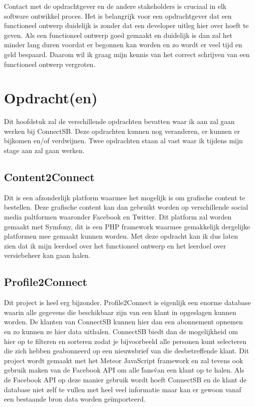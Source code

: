 \documentclass{article}
\begin{document}
Contact met de opdrachtgever en de andere stakeholders is cruciaal in elk software ontwikkel proces. Het is belangrijk voor een opdrachtgever dat een functioneel ontwerp duidelijk is zonder dat een developer uitleg hier over hoeft te geven. Als een functioneel ontwerp goed gemaakt en duidelijk is dan zal het minder lang duren voordat er begonnen kan worden en zo wordt er veel tijd en geld bespaard. Daarom wil ik graag mijn kennis van het correct schrijven van een functioneel ontwerp vergroten.



\section{Opdracht(en)}
Dit hoofdstuk zal de verschillende opdrachten bevatten waar ik aan zal gaan werken bij ConnectSB. Deze opdrachten kunnen nog veranderen, er kunnen er bijkomen en/of verdwijnen. Twee opdrachten staan al vast waar ik tijdens mijn stage aan zal gaan werken.

\subsection{Content2Connect}
Dit is een afzonderlijk platform waarmee het mogelijk is om grafische content te bestellen. Deze grafische content kan dan gebruikt worden op verschillende social media paltformen waaronder Facebook en Twitter. Dit platform zal worden gemaakt met Symfony, dit is een PHP framework waarmee gemakkelijk dergelijke platformen mee gemaakt kunnen worden. Met deze opdracht kan ik dus laten zien dat ik mijn leerdoel over het functioneel ontwerp en het leerdoel over versiebeheer kan gaan halen.

\subsection{Profile2Connect}
Dit project is heel erg bijzonder. Profile2Connect is eigenlijk een enorme database waarin alle gegevens die beschikbaar zijn van een klant in opgeslagen kunnen worden. De klanten van ConnectSB kunnen hier dan een abonnement opnemen en zo kunnen ze hier data uithalen. ConnectSB biedt dan de mogelijkheid om hier op te filteren en sorteren zodat je bijvoorbeeld alle personen kunt selecteren die zich hebben geabonneerd op een nieuwsbrief van die desbetreffende klant. Dit project wordt gemaakt met het Meteor JavaScript framework en zal tevens ook gebruik maken van de Facebook API om alle \'fans\' van een klant op te halen. Als de Facebook API op deze manier gebruik wordt hoeft ConnectSB en de klant de database niet zelf te vullen met heel veel informatie maar kan er gewoon vanaf een bestaande bron data worden geïmporteerd.

\end{document}
